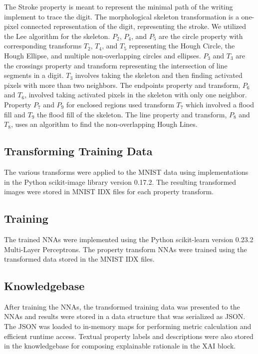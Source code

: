 \documentclass[conference]{IEEEtran}
\begin{document}
The Stroke property is meant to represent the minimal path of the writing implement to trace the digit.  The morphological skeleton transformation is a one-pixel connected representation of the digit,  representing the stroke.  We utilized the Lee\cite{Lee1994} algorithm for the skeleton.
$P_2$, $P_4$, and $P_5$ are the circle property with corresponding transforms $T_2$, $T_4$, and $T_5$ representing the Hough Circle, the Hough Ellipse, and multiple non-overlapping circles and ellipses.
$P_3$ and $T_3$ are the crossings property and transform representing the intersection of line segments in a digit.  $T_3$ involves taking the skeleton and then finding activated pixels with more than two neighbors.   The endpoints property and transform, $P_6$ and $T_6$, involved taking activated pixels in the skeleton with only one neighbor.
Property $P_7$ and $P_9$ for enclosed regions used transform $T_7$ which involved a flood fill and $T_9$ the flood fill of the skeleton.  The line property and transform, $P_8$ and $T_8$, uses an algorithm to find the non-overlapping Hough Lines.

\subsection{Transforming Training Data}

The various transforms were applied to the MNIST data using implementations in the Python scikit-image\cite{scikitimage} library version 0.17.2.  The resulting transformed images were stored in MNIST IDX files for each property transform.

\subsection{Training}

The trained NNAs were implemented using the Python scikit-learn\cite{scikitlearn} version 0.23.2 Multi-Layer Perceptrons.  The property transform NNAs were trained using the transformed data stored in the MNIST IDX files.

\subsection{Knowledgebase}

After training the NNAs, the transformed training data was presented to the NNAs and results were stored in a data structure that was serialized as JSON.  The JSON was loaded to in-memory maps for performing metric calculation and efficient runtime access.  Textual property labels and descriptions were also stored in the knowledgebase for composing explainable rationale in the XAI block.
\end{document}
